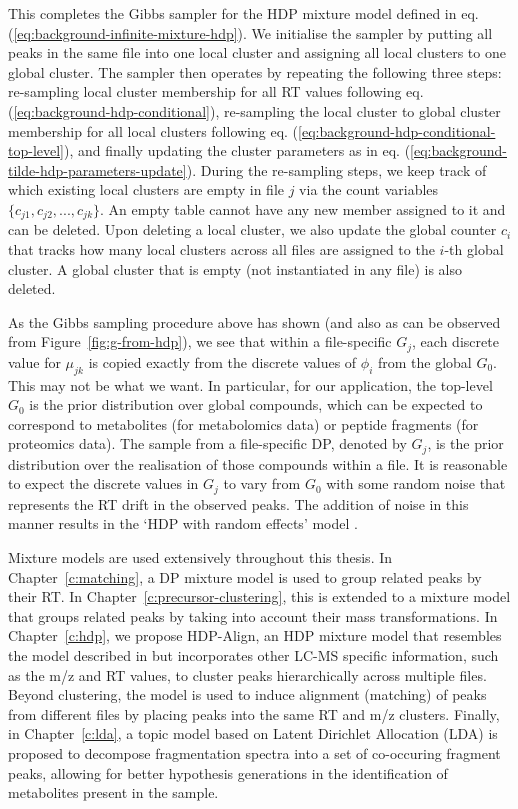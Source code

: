 This completes the Gibbs sampler for the HDP mixture model defined in eq. (\ref{eq:background-infinite-mixture-hdp}). We initialise the sampler by putting all peaks in the same file into one local cluster and assigning all local clusters to one global cluster. The sampler then operates by repeating the following three steps: re-sampling local cluster membership for all RT values following eq. (\ref{eq:background-hdp-conditional}), re-sampling the local cluster to global cluster membership for all local clusters following eq. (\ref{eq:background-hdp-conditional-top-level}), and finally updating the cluster parameters as in eq. (\ref{eq:background-tilde-hdp-parameters-update}). During the re-sampling steps, we keep track of which existing local clusters are empty in file $j$ via the count variables $\{c_{j1}, c_{j2}, ..., c_{jk}\}$. An empty table cannot have any new member assigned to it and can be deleted. Upon deleting a local cluster, we also update the global counter $c_{i}$ that tracks how many local clusters across all files are assigned to the $i$-th global cluster. A global cluster that is empty (not instantiated in any file) is also deleted. 

As the Gibbs sampling procedure above has shown (and also as can be observed from Figure~\ref{fig:g-from-hdp}), we see that within a file-specific $G_j$, each discrete value for $\mu_{jk}$ is copied exactly from the discrete values of $\phi_i$ from the global $G_0$. This may not be what we want. In particular, for our application, the top-level $G_0$ is the prior distribution over global compounds, which can be expected to correspond to metabolites (for metabolomics data) or peptide fragments (for proteomics data). The sample from a file-specific DP, denoted by $G_j$, is the prior distribution over the realisation of those compounds within a file. It is reasonable to expect the discrete values in $G_j$ to vary from $G_0$ with some random noise that represents the RT drift in the observed peaks. The addition of noise in this manner results in the `HDP with random effects' model \cite{kim2006hierarchical}. 

Mixture models are used extensively throughout this thesis. In Chapter~\ref{c:matching}, a DP mixture model is used to group related peaks by their RT. In Chapter~\ref{c:precursor-clustering}, this is extended to a mixture model that groups related peaks by taking into account their mass transformations. In Chapter~\ref{c:hdp}, we propose HDP-Align, an HDP mixture model that resembles the model described in \cite{kim2006hierarchical} but incorporates other LC-MS specific information, such as the m/z and RT values, to cluster peaks hierarchically across multiple files. Beyond clustering, the model is used to induce alignment (matching) of peaks from different files by placing peaks into the same RT and m/z clusters. Finally, in Chapter~\ref{c:lda}, a topic model based on Latent Dirichlet Allocation (LDA) is proposed to decompose fragmentation spectra into a set of co-occuring fragment peaks, allowing for better hypothesis generations in the identification of metabolites present in the sample. 

